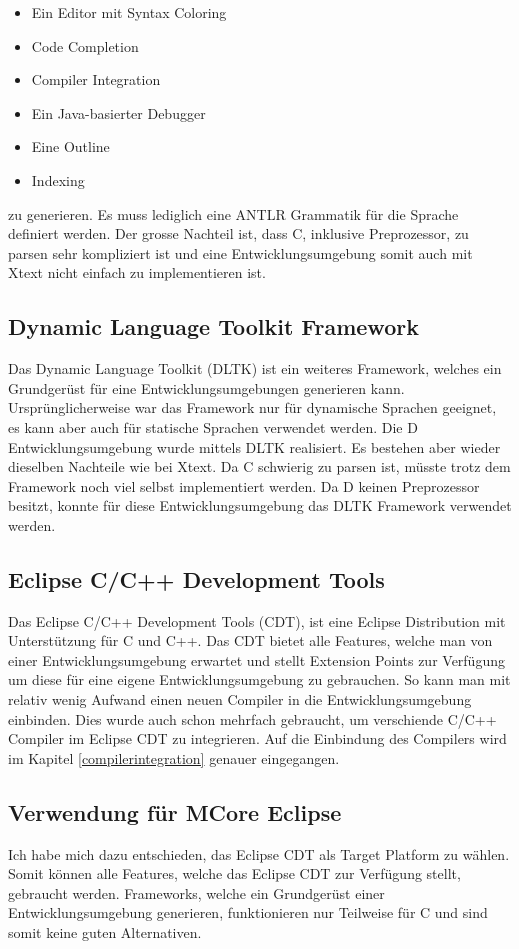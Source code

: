 \begin{itemize} 
	\item Ein Editor mit Syntax Coloring
	\item Code Completion
	\item Compiler Integration
	\item Ein Java-basierter Debugger
	\item Eine Outline
	\item Indexing
\end{itemize}

zu generieren. \cite{xtext} Es muss lediglich eine ANTLR\cite{antlr} Grammatik für die Sprache definiert werden. Der grosse Nachteil ist, dass C, inklusive Preprozessor, zu parsen sehr kompliziert ist und eine Entwicklungsumgebung somit auch mit Xtext nicht einfach zu implementieren ist.

\subsection{Dynamic Language Toolkit Framework}
Das Dynamic Language Toolkit (DLTK) ist ein weiteres Framework, welches ein Grundgerüst für eine Entwicklungsumgebungen generieren kann. Ursprünglicherweise war das Framework nur für dynamische Sprachen geeignet, es kann aber auch für statische Sprachen verwendet werden. Die D Entwicklungsumgebung wurde mittels DLTK realisiert\cite{ddt}. Es bestehen aber wieder dieselben Nachteile wie bei Xtext. Da C schwierig zu parsen ist, müsste trotz dem Framework noch viel selbst implementiert werden. Da D keinen Preprozessor besitzt, konnte für diese Entwicklungsumgebung das DLTK Framework verwendet werden.

\subsection{Eclipse C/C++ Development Tools}
Das Eclipse C/C++ Development Tools (CDT), ist eine Eclipse Distribution mit Unterstützung für C und C++. Das CDT bietet alle Features, welche man von einer Entwicklungsumgebung erwartet und stellt Extension Points zur Verfügung um diese für eine eigene Entwicklungsumgebung zu gebrauchen. So kann man mit relativ wenig Aufwand einen neuen Compiler in die Entwicklungsumgebung einbinden. Dies wurde auch schon mehrfach gebraucht, um verschiende C/C++ Compiler im Eclipse CDT zu integrieren. Auf die Einbindung des Compilers wird im Kapitel \ref{compilerintegration} genauer eingegangen.

\subsection{Verwendung für MCore Eclipse}
Ich habe mich dazu entschieden, das Eclipse CDT als Target Platform zu wählen. Somit können alle Features, welche das Eclipse CDT zur Verfügung stellt, gebraucht werden. Frameworks, welche ein Grundgerüst einer Entwicklungsumgebung generieren, funktionieren nur Teilweise für C und sind somit keine guten Alternativen.
